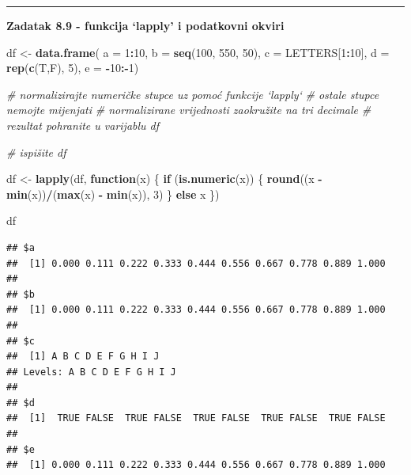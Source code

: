 \documentclass[]{book}
\newenvironment{Shaded}{\begin{snugshade}}{\end{snugshade}}
\newcommand{\KeywordTok}[1]{\textcolor[rgb]{0.13,0.29,0.53}{\textbf{#1}}}
\newcommand{\DataTypeTok}[1]{\textcolor[rgb]{0.13,0.29,0.53}{#1}}
\newcommand{\DecValTok}[1]{\textcolor[rgb]{0.00,0.00,0.81}{#1}}
\newcommand{\StringTok}[1]{\textcolor[rgb]{0.31,0.60,0.02}{#1}}
\newcommand{\CommentTok}[1]{\textcolor[rgb]{0.56,0.35,0.01}{\textit{#1}}}
\newcommand{\ControlFlowTok}[1]{\textcolor[rgb]{0.13,0.29,0.53}{\textbf{#1}}}
\newcommand{\OperatorTok}[1]{\textcolor[rgb]{0.81,0.36,0.00}{\textbf{#1}}}
\newcommand{\NormalTok}[1]{#1}
\theoremstyle{definition}
\theoremstyle{definition}
\theoremstyle{definition}
\theoremstyle{remark}
\begin{document}
\begin{center}\rule{0.5\linewidth}{\linethickness}\end{center}

\textbf{Zadatak 8.9 - funkcija `lapply' i podatkovni okviri}

\begin{Shaded}
\begin{Highlighting}[]
\NormalTok{df <-}\StringTok{ }\KeywordTok{data.frame}\NormalTok{( }\DataTypeTok{a =} \DecValTok{1}\OperatorTok{:}\DecValTok{10}\NormalTok{, }\DataTypeTok{b =} \KeywordTok{seq}\NormalTok{(}\DecValTok{100}\NormalTok{, }\DecValTok{550}\NormalTok{, }\DecValTok{50}\NormalTok{), }
                  \DataTypeTok{c =}\NormalTok{ LETTERS[}\DecValTok{1}\OperatorTok{:}\DecValTok{10}\NormalTok{], }\DataTypeTok{d =} \KeywordTok{rep}\NormalTok{(}\KeywordTok{c}\NormalTok{(T,F), }\DecValTok{5}\NormalTok{), }
                  \DataTypeTok{e =} \OperatorTok{-}\DecValTok{10}\OperatorTok{:-}\DecValTok{1}\NormalTok{)}

\CommentTok{# normalizirajte numeričke stupce uz pomoć funkcije `lapply`}
\CommentTok{# ostale stupce nemojte mijenjati}
\CommentTok{# normalizirane vrijednosti zaokružite na tri decimale}
\CommentTok{# rezultat pohranite u varijablu df}

\CommentTok{# ispišite df}
\end{Highlighting}
\end{Shaded}

\begin{Shaded}
\begin{Highlighting}[]
\NormalTok{df <-}\StringTok{ }\KeywordTok{lapply}\NormalTok{(df, }\ControlFlowTok{function}\NormalTok{(x) \{}
    \ControlFlowTok{if}\NormalTok{ (}\KeywordTok{is.numeric}\NormalTok{(x)) \{}
        \KeywordTok{round}\NormalTok{((x }\OperatorTok{-}\StringTok{ }\KeywordTok{min}\NormalTok{(x))}\OperatorTok{/}\NormalTok{(}\KeywordTok{max}\NormalTok{(x) }\OperatorTok{-}\StringTok{ }\KeywordTok{min}\NormalTok{(x)), }\DecValTok{3}\NormalTok{)}
\NormalTok{    \} }\ControlFlowTok{else}\NormalTok{ x \})}

\NormalTok{df}
\end{Highlighting}
\end{Shaded}

\begin{verbatim}
## $a
##  [1] 0.000 0.111 0.222 0.333 0.444 0.556 0.667 0.778 0.889 1.000
## 
## $b
##  [1] 0.000 0.111 0.222 0.333 0.444 0.556 0.667 0.778 0.889 1.000
## 
## $c
##  [1] A B C D E F G H I J
## Levels: A B C D E F G H I J
## 
## $d
##  [1]  TRUE FALSE  TRUE FALSE  TRUE FALSE  TRUE FALSE  TRUE FALSE
## 
## $e
##  [1] 0.000 0.111 0.222 0.333 0.444 0.556 0.667 0.778 0.889 1.000
\end{verbatim}
\end{document}
